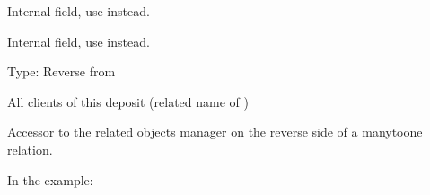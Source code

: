 \documentclass[letterpaper,10pt,russian]{sphinxmanual}
\begin{document}
\begin{fulllineitems}

\begin{fulllineitems}
\label{\detokenize{myapp:polls.models.Deposit.bank_id}}
\pysigstartsignatures
\pysigline
{}
\pysigstopsignatures
\sphinxAtStartPar
Internal field, use {\hyperref[\detokenize{myapp:polls.models.Deposit.bank}]{}} instead.

\end{fulllineitems}


\begin{fulllineitems}
\label{\detokenize{myapp:polls.models.Deposit.client_id1_id}}
\pysigstartsignatures
\pysigline
{}
\pysigstopsignatures
\sphinxAtStartPar
Internal field, use {\hyperref[\detokenize{myapp:polls.models.Deposit.client_id1}]{}} instead.

\end{fulllineitems}


\begin{fulllineitems}
\label{\detokenize{myapp:polls.models.Deposit.clients}}
\pysigstartsignatures
\pysigline
{}
\pysigstopsignatures
\sphinxAtStartPar
Type: Reverse  from {\hyperref[\detokenize{myapp:polls.models.Client}]{}}

\sphinxAtStartPar
All clients of this deposit (related name of {\hyperref[\detokenize{myapp:polls.models.Client.deposit}]{}})

\sphinxAtStartPar
Accessor to the related objects manager on the reverse side of a
many\sphinxhyphen{}to\sphinxhyphen{}one relation.

\sphinxAtStartPar
In the example:

\begin{sphinxVerbatim}[commandchars=\\\{\}]
       
\end{sphinxVerbatim}


\end{fulllineitems}
\end{fulllineitems}
\end{document}
